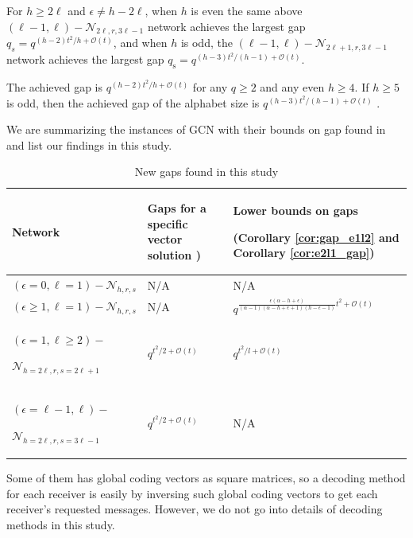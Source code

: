 For $h\geq2\ell$ and $\epsilon\neq h-2\ell$, when $h$ is even the
same above $\left(\ell-1,\ell\right)-\mathcal{N}_{2\ell,r,3\ell-1}$
network achieves the largest gap $q_{s}=q^{(h-2)t^{2}/h+\mathcal{O}(t)}$,
and when $h$ is odd, the $\left(\ell-1,\ell\right)-\mathcal{N}_{2\ell+1,r,3\ell-1}$
network achieves the largest gap $q_{\mathrm{s}}=q^{(h-3)t^{2}/\left(h-1\right)+\mathcal{O}(t)}$.
\begin{rem}
The achieved gap is $q^{(h-2)t^{2}/h+\mathcal{O}(t)}$ for any $q\geq2$
and any even $h\geq4$. If $h\geq5$ is odd, then the achieved gap
of the alphabet size is $q^{(h-3)t^{2}/\left(h-1\right)+\mathcal{O}(t)}$
\cite{Wachter-Zeh:2018}.
\end{rem}
We are summarizing the instances of GCN with their bounds on gap found
in \cite{Wachter-Zeh:2018} and list our findings in this study.
\begin{table}

\caption{New gaps found in this study\label{tab:New-gap-found}}

\begin{centering}
\begin{tabular}{|>{\centering}p{0.15\paperwidth}|>{\centering}p{0.1\paperwidth}|>{\centering}p{0.2\paperwidth}|}
\hline 
\centering{}Network & \centering{}Gaps for a specific vector solution \cite{Wachter-Zeh:2018}) & \begin{centering}
Lower bounds on gaps 
\par\end{centering}
\centering{}(Corollary \ref{cor:gap_e1l2} and Corollary \ref{cor:e2l1_gap})\tabularnewline
\hline 
\hline 
\centering{}$\left(\epsilon=0,\ell=1\right)-\mathcal{N}_{h,r,s}$ & \centering{}N/A & \centering{}N/A\tabularnewline
\hline 
\centering{}$\left(\epsilon\geq1,\ell=1\right)-\mathcal{N}_{h,r,s}$ & \centering{}N/A & \centering{}$q^{\frac{\epsilon\left(\alpha-h+\epsilon\right)}{\left(\alpha-1\right)\left(\alpha-h+\epsilon+1\right)\left(h-\epsilon-1\right)}t^{2}+\mathcal{O}(t)}$\tabularnewline
\hline 
\begin{centering}
$(\epsilon=1,\ell\geq2)-$
\par\end{centering}
$\mathcal{N}_{h=2\ell,r,s=2\ell+1}$ & \centering{}$q^{t^{2}/2+\mathcal{O}\left(t\right)}$ & \centering{}$q^{t^{2}/l+\mathcal{O}\left(t\right)}$\tabularnewline
\hline 
\begin{centering}
$\left(\epsilon=\ell-1,\ell\right)-$
\par\end{centering}
$\mathcal{N}_{h=2\ell,r,s=3\ell-1}$ & \centering{}$q^{t^{2}/2+\mathcal{O}\left(t\right)}$ & \centering{}N/A\tabularnewline
\hline 
\end{tabular}
\par\end{centering}
\end{table}
Some of them has global coding vectors as square matrices, so a decoding
method for each receiver is easily by inversing such global coding
vectors to get each receiver's requested messages. However, we do
not go into details of decoding methods in this study.

\clearpage